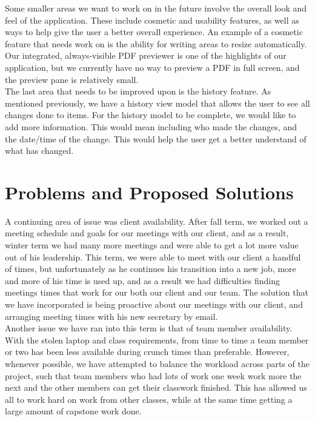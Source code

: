\documentclass[onecolumn, draftclsnofoot,10pt, compsoc]{IEEEtran}
\begin{document}
\noindent Some smaller areas we want to work on in the future involve the overall look and feel of the application.
These include cosmetic and usability features, as well as ways to help give the user a better overall experience.
An example of a cosmetic feature that needs work on is the ability for writing areas
to resize automatically. Our integrated, always-visible PDF previewer is one of the highlights of our
application, but we currently have no way to preview a PDF in full screen, and the preview pane is relatively small. \\

\noindent The last area that needs to be improved upon is the history feature. As mentioned previously,
we have a history view model that allows the user to see all changes done to items. For the history model
to be complete, we would like to add more information. This would mean including who made the changes,
and the date/time of the change. This would help the user get a better understand of what has changed. \\

\newpage

\section{Problems and Proposed Solutions}

\noindent A continuing area of issue was client availability. After fall term, we worked out a meeting schedule
and goals for our meetings with our client, and as a result, winter term we had many more meetings and
were able to get a lot more value out of his leadership. This term, we were able to meet with
our client a handful of times, but unfortunately as he continues his transition into a new job,
more and more of his time is used up, and as a result we had difficulties finding
meetings times that work for our both our client and our team. The solution that we have incorporated is being proactive
about our meetings with our client, and arranging meeting times with his new secretary by email.\\

\noindent Another issue we have ran into this term is that of team member availability.
With the stolen laptop and class requirements, from time to time a team member or two has been less
available during crunch times than preferable. However, whenever possible, we have attempted to
balance the workload across parts of the project, such that team members who had lots of work one week
work more the next and the other members can get their classwork finished. This has allowed us all
to work hard on work from other classes, while at the same time getting a large amount of
capstone work done. \\
\end{document}
